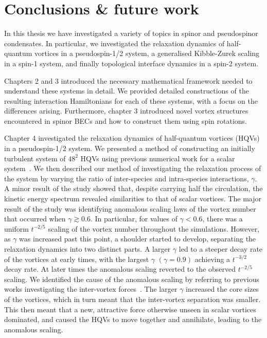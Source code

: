 \chapter{Conclusions \& future work}
In this thesis we have investigated a variety of topics in spinor and
pseudospinor condensates.
In particular, we investigated the relaxation dynamics of half-quantum vortices
in a pseudospin-1/2 system, a generalised Kibble-Zurek scaling in a spin-1
system, and finally topological interface dynamics in a spin-2 system.

Chapters 2 and 3 introduced the necessary mathematical framework needed to
understand these systems in detail.
We provided detailed constructions of the resulting interaction Hamiltonians for
each of these systems, with a focus on the differences arising.
Furthermore, chapter 3 introduced novel vortex structures encountered in spinor
BECs and how to construct them using spin rotations.

Chapter 4 investigated the relaxation dynamics of half-quantum vortices (HQVs)
in a pseudospin-1/2 system.
We presented a method of constructing an initially turbulent system of \(48^2\)
HQVs using previous numerical work for a scalar system~\cite{Billam2014}.
We then described our method of investigating the relaxation process of the
system by varying the ratio of inter-species and intra-species interactions,
\(\gamma \).
A minor result of the study showed that, despite carrying half the circulation,
the kinetic energy spectrum revealed similarities to that of scalar vortices.
The major result of the study was identifying anomalous scaling laws of the
vortex number that occurred when \(\gamma \gtrsim 0.6\).
In particular, for values of \(\gamma < 0.6\), there was a uniform \(t^{-2/5}\)
scaling of the vortex number throughout the simulations.
However, as \(\gamma \) was increased past this point, a shoulder started to
develop, separating the relaxation dynamics into two distinct parts.
A larger \(\gamma \) led to a steeper decay rate of the vortices at early times,
with the largest \(\gamma \) \((\gamma = 0.9)\) achieving a \(t^{-3/2}\) decay
rate.
At later times the anomalous scaling reverted to the observed \(t^{-2/5}\)
scaling.
We identified the cause of the anomalous scaling by referring to previous works
investigating the inter-vortex forces~\cite{Eto2011, Kasamatsu2016}.
The larger \(\gamma \) increased the core sizes of the vortices, which in turn
meant that the inter-vortex separation was smaller.
This then meant that a new, attractive force otherwise unseen in scalar
vortices dominated, and caused the HQVs to move together and annihilate,
leading to the anomalous scaling.

